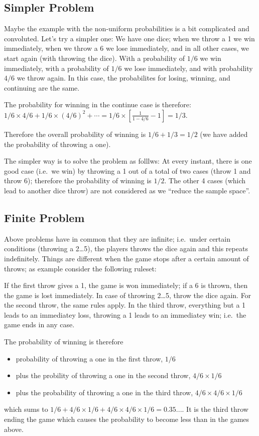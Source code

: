 \subsection{Simpler Problem}

Maybe the example with the non-uniform probabilities is a bit
complicated and convoluted. Let's try a simpler one: We have one dice;
when we throw a 1 we win immediately, when we throw a 6 we lose
immediately, and in all other cases, we start again (with throwing the
dice). With a probability of \(1/6\) we win immediately, with a
probability of \(1/6\) we lose immediately, and with probability \(4/6\)
we throw again. In this case, the probabilites for losing, winning, and
continuing are the same.

The probability for winning in the continue case is therefore:
\(1/6 \times 4/6 + 1/6 \times (4/6)^2 + \cdots = 1/6 \times \left[ \frac{1}{1-4/6} - 1\right] = 1/3\).

Therefore the overall probability of winning is \(1/6 + 1/3 = 1/2\) (we
have added the probability of throwing a one).

The simpler way is to solve the problem as folllws: At every instant,
there is one good case (i.e.~we win) by throwing a 1 out of a total of
two cases (throw 1 and throw 6); therefore the probability of winning is
\(1/2\). The other 4 cases (which lead to another dice throw) are not
considered as we ``reduce the sample space''.

\subsection{Finite Problem}

Above problems have in common that they are infinite; i.e.~under certain
conditions (throwing a 2\ldots{}5), the players throws the dice again
and this repeats indefinitely. Things are different when the game stops
after a certain amount of throws; as example consider the following
ruleset:

If the first throw gives a 1, the game is won immediately; if a 6 is
thrown, then the game is lost immediately. In case of throwing
2\ldots{}5, throw the dice again. For the second throw, the same rules
apply. In the third throw, everything but a 1 leads to an immediatey
loss, throwing a 1 leads to an immediatey win; i.e.~the game ends in any
case.

The probability of winning is therefore

\begin{itemize}

\item
  probability of throwing a one in the first throw, \(1/6\)
\item
  plus the probility of throwing a one in the second throw,
  \(4/6 \times 1/6\)
\item
  plus the probability of throwing a one in the third throw,
  \(4/6 \times 4/6 \times 1/6\)
\end{itemize}

which sums to
\(1/6 + 4/6 \times 1/6 + 4/6 \times 4/6 \times 1/6 = 0.35...\). It is
the third throw ending the game which causes the probability to become
less than in the games above.
